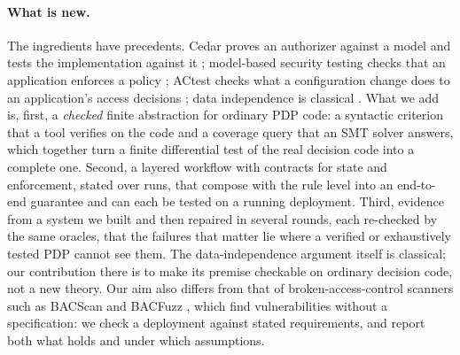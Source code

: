 \documentclass[sigconf,review,anonymous]{acmart}
\begin{document}
\paragraph{What is new.} The ingredients have precedents. Cedar proves an authorizer against a model and tests
the implementation against it \cite{cutler2024cedar,disselkoen2024vgd}; model-based security testing checks
that an application enforces a policy \cite{mouelhi2008models}; ACtest checks what a configuration change does to
an application's access decisions \cite{xiang2025actest}; data independence is classical
\cite{wolper1986,lazic2003semantic}. What we add is, first, a \emph{checked} finite abstraction for ordinary PDP
code: a syntactic criterion that a tool verifies on the code and a coverage query that an SMT solver answers,
which together turn a finite differential test of the real decision code into a complete one. Second, a
layered workflow with contracts for state and enforcement, stated over runs, that compose with the rule level
into an end-to-end guarantee and can each be tested on a running deployment. Third, evidence from a system we
built and then repaired in several rounds, each re-checked by the same oracles, that the failures that matter lie where a verified or exhaustively tested PDP
cannot see them. The data-independence argument itself is classical; our contribution there is to make its
premise checkable on ordinary decision code, not a new theory. Our aim also differs from that of
broken-access-control scanners such as BACScan and BACFuzz \cite{liu2025bacscan,dharmaadi2025bacfuzz}, which
find vulnerabilities without a specification: we check a deployment against stated requirements, and report
both what holds and under which assumptions.
\end{document}
